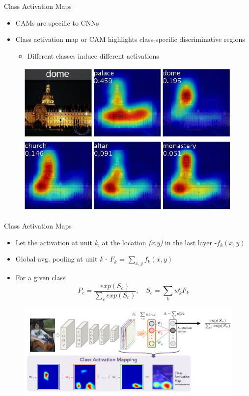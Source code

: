 \documentclass[11pt,compress,t,notes=noshow, aspectratio=169, xcolor=table]{beamer}
\begin{document}
\begin{frame}{Class Activation Maps} %
    \begin{itemize}
        \item CAMs are specific to CNNs
        \item Class activation map or CAM highlights class-specific discriminative regions
        \begin{itemize}
            \item Different classes induce different activations
        \end{itemize}
    \end{itemize}
    \begin{figure}
        \centering
        \includegraphics[width=0.5\linewidth]{bild9}
    \end{figure}
\end{frame}
	
\begin{frame}{Class Activation Maps}
    \begin{itemize}
        \item Let the activation at unit \textit{k}, at the location \textit{(x,y)} in the last layer -\textit{$f_k(x,y)$}
        \item Global avg. pooling at unit \textit{k} - $F_k$ = $\sum\limits_{x,y}f_k(x,y)$
        \item For a given class
                \begin{equation*}
                    P_c = \frac{exp(S_c)}{\sum_c exp(S_c)},\quad S_c = \sum\limits_k w_k^c F_k
                \end{equation*}
    \end{itemize}
    \begin{figure}
        \centering
        \includegraphics[width=0.6\linewidth]{bild10}
    \end{figure}
\end{frame}	
	
\end{document}
